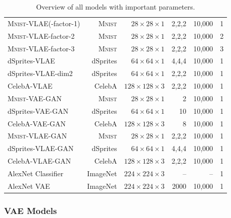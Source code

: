 \begin{table}
\begin{tabular}{lrrrrr}
        \textsc{Mnist}-\ac{VLAE}(-factor-1) & \textsc{Mnist} & $28\times 28\times 1$ & 2,2,2 & 10,000 & 1 \\
        \textsc{Mnist}-\ac{VLAE}-factor-2 & \textsc{Mnist} & $28\times 28\times 1$ & 2,2,2 & 10,000 & 2 \\
        \textsc{Mnist}-\ac{VLAE}-factor-3 & \textsc{Mnist} & $28\times 28\times 1$ & 2,2,2 & 10,000 & 3 \\
        dSprites-\ac{VLAE} & dSprites & $64\times 64\times 1$ & 4,4,4 & 10,000 & 1 \\
        dSprites-\ac{VLAE}-dim2 & dSprites & $64\times 64\times 1$ & 2,2,2 & 10,000 & 1 \\
        CelebA-\ac{VLAE} & CelebA & $128\times 128\times 3$ & 2,2,2 & 10,000 & 1 \\
        \midrule
        \textsc{Mnist}-\ac{VAE}-\ac{GAN} & \textsc{Mnist} & $28\times 28\times 1$ & 2 & 10,000 & 1\\
        dSprites-\ac{VAE}-\ac{GAN} & dSprites & $64\times 64\times 1$ & 10 & 10,000 & 1\\
        CelebA-\ac{VAE}-\ac{GAN} & CelebA & $128\times 128\times 3$ & 8 & 10,000 & 1\\
        \midrule
        \textsc{Mnist}-\ac{VLAE}-\ac{GAN} & \textsc{Mnist} & $28\times 28\times 1$ & 2,2,2 & 10,000 & 1\\
        dSprites-\ac{VLAE}-\ac{GAN} & dSprites & $64\times 64\times 1$ & 4,4,4 & 10,000 & 1\\
        CelebA-\ac{VLAE}-\ac{GAN} & CelebA & $128\times 128\times 3$ & 2,2,2 & 10,000 & 1\\
        \midrule
        AlexNet Classifier & ImageNet & $224\times 224\times 3$ & -- & -- & 1\\
        \midrule
        AlexNet \ac{VAE} & ImageNet & $224\times 224\times 3$ & 2000 & 10,000 & 1\\
        \bottomrule
    \end{tabular}
    \caption[Models Overview]{Overview of all models with important parameters.}
    \label{tbl:model_overview}
\end{table}

\subsubsection{VAE Models}\label{subsubsec:vae_models}

